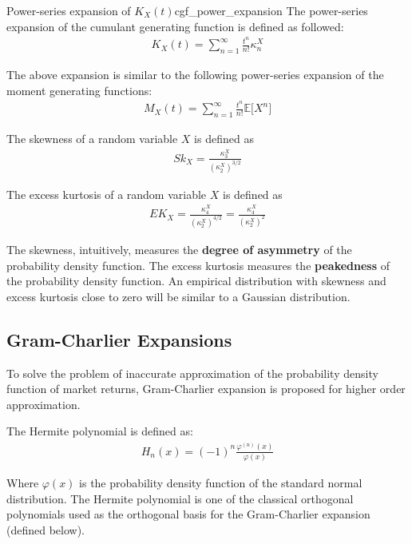 \begin{proposition}{Power-series expansion of $K_X(t)$}{cgf_power_expansion}
    The power-series expansion of the cumulant generating function is defined as followed:
    \begin{align*}
        K_X(t) = \sum_{n=1}^\infty \frac{t^n}{n!}\kappa_n^X
    \end{align*}

    \noindent\newline The above expansion is similar to the following power-series expansion of the moment generating functions:
    \begin{align*}
        M_X(t) = \sum_{n=1}^\infty \frac{t^n}{n!}\mathbb{E}\Big[X^n\Big]
    \end{align*}
\end{proposition}

\begin{definition}
    The skewness of a random variable $X$ is defined as
    \begin{align*}
        Sk_X = \frac{\kappa_3^X}{(\kappa_2^X)^{3/2}}
    \end{align*}

    The excess kurtosis of a random variable $X$ is defined as
    \begin{align*}
        EK_X = \frac{\kappa_4^X}{(\kappa_2^X)^{4/2}} = \frac{\kappa_4^X}{(\kappa_2^X)^{2}}
    \end{align*}
\end{definition}

\noindent \newline The skewness, intuitively, measures the \textbf{degree of asymmetry} of the probability density function. The excess kurtosis measures the \textbf{peakedness} of the probability density function. An empirical distribution with skewness and excess kurtosis close to zero will be similar to a Gaussian distribution.

\subsection{Gram-Charlier Expansions}
To solve the problem of inaccurate approximation of the probability density function of market returns, Gram-Charlier expansion is proposed for higher order approximation.

\begin{definition}
    The Hermite polynomial is defined as:
    \begin{align*}
        H_n(x) = (-1)^n \frac{\varphi^{(n)}(x)}{\varphi(x)}
    \end{align*}

    \noindent\newline Where $\varphi(x)$ is the probability density function of the standard normal distribution. The Hermite polynomial is one of the classical orthogonal polynomials used as the orthogonal basis for the Gram-Charlier expansion \cite{article:tanaka} (defined below).
\end{definition}

